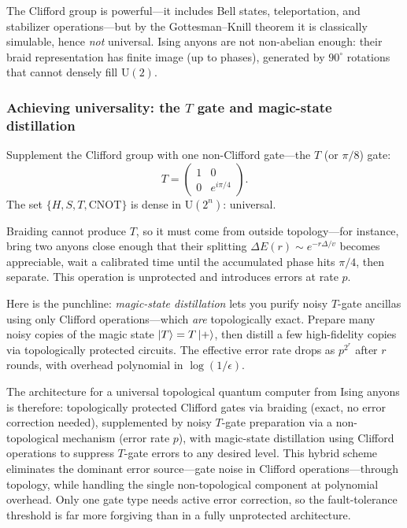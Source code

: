 The Clifford group is powerful---it includes Bell states, teleportation, and stabilizer operations---but by the Gottesman--Knill theorem it is classically simulable, hence \emph{not} universal.  Ising anyons are not non-abelian enough: their braid representation has finite image (up to phases), generated by $90^\circ$ rotations that cannot densely fill $\mathrm{U}(2)$.

\subsubsection*{Achieving universality: the $T$ gate and magic-state
distillation}

Supplement the Clifford group with one non-Clifford gate---the $T$ (or $\pi/8$) gate:
\begin{equation}
  T = \begin{pmatrix} 1 & 0 \\ 0 & e^{i\pi/4} \end{pmatrix}.
  \label{eq:T-gate}
\end{equation}
The set $\{H, S, T, \mathrm{CNOT}\}$ is dense in $\mathrm{U}(2^n)$: universal.

Braiding cannot produce $T$, so it must come from outside topology---for instance, bring two anyons close enough that their splitting $\Delta E(r) \sim e^{-r\Delta/v}$ becomes appreciable, wait a calibrated time until the accumulated phase hits $\pi/4$, then separate.  This operation is unprotected and introduces errors at rate $p$.

Here is the punchline: \emph{magic-state distillation} \cite{NayakSimonSternFreedmanDasSarma2008NonabelianAnyons} lets you purify noisy $T$-gate ancillas using only Clifford operations---which \emph{are} topologically exact.  Prepare many noisy copies of the magic state $\left|T\right\rangle = T\left|+\right\rangle$, then distill a few high-fidelity copies via topologically protected circuits.  The effective error rate drops as $p^{2^r}$ after $r$ rounds, with overhead polynomial in $\log(1/\epsilon)$.

The architecture for a universal topological quantum computer from Ising anyons is therefore: topologically protected Clifford gates via braiding (exact, no error correction needed), supplemented by noisy $T$-gate preparation via a non-topological mechanism (error rate $p$), with magic-state distillation using Clifford operations to suppress $T$-gate errors to any desired level.  This hybrid scheme eliminates the dominant error source---gate noise in Clifford operations---through topology, while handling the single non-topological component at polynomial overhead.  Only one gate type needs active error correction, so the fault-tolerance threshold is far more forgiving than in a fully unprotected architecture.


